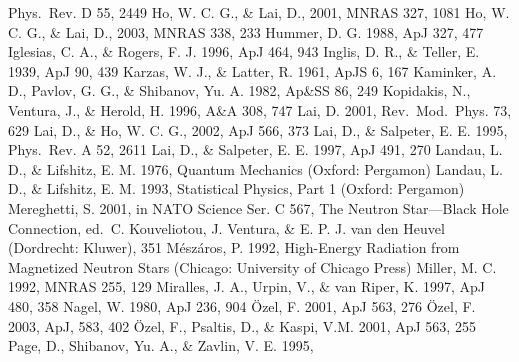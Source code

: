 \documentclass{emulateapj}
\begin{document}
\begin{thebibliography}{}
Phys.\ Rev. D 55, 2449
%
Ho, W. C. G., \& Lai, D., 2001,
MNRAS 327, 1081
%
Ho, W. C. G., \& Lai, D., 2003,
MNRAS 338, 233
%
Hummer, D. G. 1988, ApJ 327, 477
%
Iglesias, C. A., \& Rogers, F. J. 1996,
ApJ 464, 943
%
Inglis, D. R., \& Teller, E. 1939,
ApJ 90, 439
%
Karzas, W. J., \& Latter, R. 1961,
ApJS 6, 167
%
Kaminker, A. D., Pavlov, G. G., \& Shibanov, Yu. A. 1982,
Ap\&SS 86, 249
%
 Kopidakis, N., Ventura, J., \& Herold, H. 1996,
 A\&A 308, 747
%
Lai, D. 2001,
Rev.\ Mod.\ Phys. 73, 629
%
Lai, D., \& Ho, W. C. G., 2002,
ApJ 566, 373
%
Lai, D., \& Salpeter, E. E. 1995,
Phys.\ Rev. A 52, 2611
%
Lai, D., \& Salpeter, E. E. 1997,
ApJ 491, 270
%
 Landau, L. D., \& Lifshitz, E. M. 1976,
 Quantum Mechanics
       (Oxford: Pergamon)
%
Landau, L. D., \& Lifshitz, E. M. 1993,
Statistical Physics, Part 1
       (Oxford: Pergamon)
%
Mereghetti, S. 2001,
in NATO Science Ser. C 567,
The Neutron Star---Black Hole Connection,
ed.\ C. Kouveliotou, J. Ventura, \& E. P. J. van den Heuvel
       (Dordrecht: Kluwer), 351
%
M\'esz\'aros, P. 1992,
High-Energy Radiation from Magnetized Neutron Stars
       (Chicago: University of Chicago Press)
%
Miller, M. C. 1992,
MNRAS 255, 129
%
Miralles, J. A., Urpin, V., \& van Riper, K. 1997,
ApJ 480, 358
%
Nagel, W. 1980, ApJ 236, 904
%
{\"O}zel, F. 2001,
ApJ 563, 276
%
{\"O}zel, F. 2003,
ApJ, 583, 402
%
{\"O}zel, F., Psaltis, D., \& Kaspi, V.M. 2001,
ApJ 563, 255
%
Page, D., Shibanov, Yu. A., \& Zavlin, V. E. 1995,

\end{thebibliography}
\end{document}
